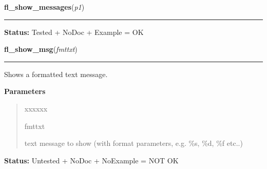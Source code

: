     \label{xformslib:library:fl_show_messages}

    \vspace{0.5ex}

\hspace{.8\funcindent}\begin{boxedminipage}{\funcwidth}

    \raggedright \textbf{fl\_show\_messages}(\textit{p1})

    \vspace{-1.5ex}

    \rule{\textwidth}{0.5\fboxrule}
\setlength{\parskip}{2ex}
\setlength{\parskip}{1ex}
\textbf{Status:} Tested + NoDoc + Example = OK



    \end{boxedminipage}

    \label{xformslib:library:fl_show_msg}

    \vspace{0.5ex}

\hspace{.8\funcindent}\begin{boxedminipage}{\funcwidth}

    \raggedright \textbf{fl\_show\_msg}(\textit{fmttxt})

    \vspace{-1.5ex}

    \rule{\textwidth}{0.5\fboxrule}
\setlength{\parskip}{2ex}
    Shows a formatted text message.

\setlength{\parskip}{1ex}
      \textbf{Parameters}
      \vspace{-1ex}

      \begin{quote}
        \begin{Ventry}{xxxxxx}

          \item[fmttxt]

          text message to show (with format parameters, e.g. \%s, \%d, \%f 
          etc..)

        \end{Ventry}

      \end{quote}

\textbf{Status:} Untested + NoDoc + NoExample = NOT OK



    \end{boxedminipage}


